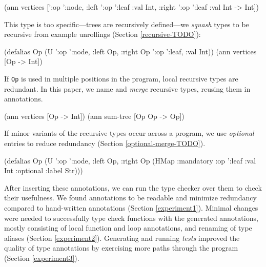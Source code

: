 \begin{cljlisting}
(ann vertices ['{:op ':node,
                 :left '{:op ':leaf :val Int},
                 :right '{:op ':leaf :val Int}}
               -> Int])
\end{cljlisting}

This type is too specific---trees are recursively
defined---we \textit{squash} types to be
recursive from example unrollings (Section \ref{recursive-TODO}):

\begin{cljlisting}
(defalias Op 
  (U '{:op ':node, :left Op, :right Op}
     '{:op ':leaf, :val Int}))
(ann vertices [Op -> Int])
\end{cljlisting}

%
If \texttt{Op} is used in multiple positions
in the program, local recursive types are redundant.
In this paper, we name and \textit{merge} recursive
types, reusing them in annotations.
 
\begin{cljlisting}
(ann vertices [Op -> Int])
(ann sum-tree [Op Op -> Op])
\end{cljlisting}
 
If minor variants of the recursive types occur
across a program,
we use \textit{optional} entries%
to reduce redundancy (Section \ref{optional-merge-TODO}).
 
\begin{cljlisting}
(defalias Op 
  (U '{:op ':node, :left Op, :right Op}
     (HMap :mandatory {:op ':leaf :val Int}
           :optional {:label Str})))
\end{cljlisting}

After inserting these annotations, we can run the
type checker over them to check their usefulness.
We found annotations to be readable and minimize
redundancy compared to hand-written annotations
(Section \ref{experiment1}).
Minimal changes were needed to successfully type check
functions with the generated annotations,
mostly consisting of local function and loop annotations,
and renaming of type aliases
(Section \ref{experiment2}).
Generating and running \textit{tests} improved the quality
of type annotations by exercising more paths through the
program (Section \ref{experiment3}).

